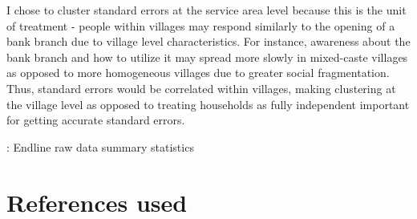 \documentclass[12pt]{article}
\begin{document}
I chose to cluster standard errors at the service area level because this is the unit of treatment - people within villages may respond similarly to the opening of a bank branch due to village level characteristics. For instance, awareness about the bank branch and how to utilize it may spread more slowly in mixed-caste villages as opposed to more homogeneous villages due to greater social fragmentation. Thus, standard errors would be correlated within villages, making clustering at the village level as opposed to treating households as fully independent important for getting accurate standard errors.



\begin{table}[H]
    \centering
    \scriptsize %
    \setlength{\tabcolsep}{2pt}
    \renewcommand{\arraystretch}{2}
    \resizebox{\textwidth}{!}{}
    \caption{: Endline raw data summary statistics}
\end{table}





\section{References used}
\end{document}
